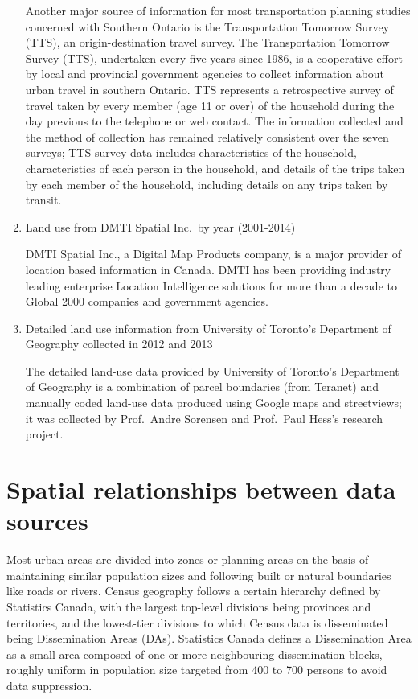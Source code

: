 \begin{enumerate}
    Another major source of information for most transportation planning studies concerned with Southern Ontario is the Transportation Tomorrow Survey (TTS), an origin-destination travel survey\cite{DataManagementGroup2014}.
    The Transportation Tomorrow Survey (TTS), undertaken every five years since 1986, is a cooperative effort by local and provincial government agencies to collect information about urban travel in southern Ontario.
    TTS represents a retrospective survey of travel taken by every member (age 11 or over) of the household during the day previous to the telephone or web contact.
    The information collected and the method of collection has remained relatively consistent over the seven surveys;
    TTS survey data includes characteristics of the household, characteristics of each person in the household, and details of the trips taken by each member of the household, including details on any trips taken by transit\cite{Ashby2018}.

    \item Land use from DMTI Spatial Inc.\ by year (2001-2014)

    DMTI Spatial Inc., a Digital Map Products company, is a major provider of location based information in Canada.
    DMTI has been providing industry leading enterprise Location Intelligence solutions for more than a decade to Global 2000 companies and government agencies\cite{DMTISpatialInc.2014}.

    \item Detailed land use information from University of Toronto's Department of Geography collected in 2012 and 2013

    The detailed land-use data provided by University of Toronto's Department of Geography is a combination of parcel boundaries (from Teranet) and manually coded land-use data produced using Google maps and streetviews;
    it was collected by Prof.\ Andre Sorensen and Prof.\ Paul Hess's research project.

\end{enumerate}

\section{Spatial relationships between data sources} \label{sec:spatial_relationships}

Most urban areas are divided into zones or planning areas on the basis of maintaining similar population sizes and following built or natural boundaries like roads or rivers.
Census geography follows a certain hierarchy defined by Statistics Canada, with the largest top-level divisions being provinces and territories, and the lowest-tier divisions to which Census data is disseminated being Dissemination Areas (DAs)\cite{StatisticsCanada2018}.
Statistics Canada defines a Dissemination Area as a small area composed of one or more neighbouring dissemination blocks, roughly uniform in population size targeted from 400 to 700 persons to avoid data suppression\cite{StatisticsCanada2015}.

